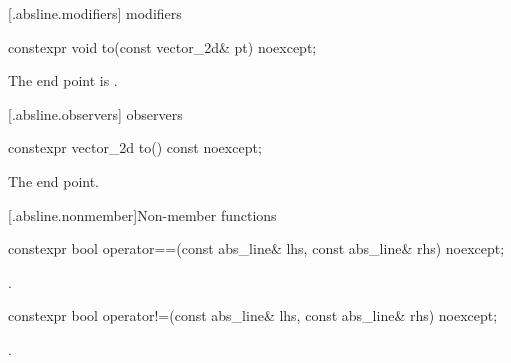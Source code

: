  [\iotwod.absline.modifiers]{ modifiers}

%
\begin{itemdecl}
constexpr void to(const vector_2d& pt) noexcept;
\end{itemdecl}
\begin{itemdescr}
\pnum
\effects
The end point is .
\end{itemdescr}

 [\iotwod.absline.observers]{ observers}

%
\begin{itemdecl}
constexpr vector_2d to() const noexcept;
\end{itemdecl}
\begin{itemdescr}
\pnum
\returns
The end point.
\end{itemdescr}

 [\iotwod.absline.nonmember]{Non-member functions}

%
\begin{itemdecl}
constexpr bool operator==(const abs_line& lhs, const abs_line& rhs) noexcept;
\end{itemdecl}
\begin{itemdescr}
\pnum
\returns
{}.
\end{itemdescr}

%
\begin{itemdecl}
constexpr bool operator!=(const abs_line& lhs, const abs_line& rhs) noexcept;
\end{itemdecl}
\begin{itemdescr}
\pnum
\returns
{}.
\end{itemdescr}
